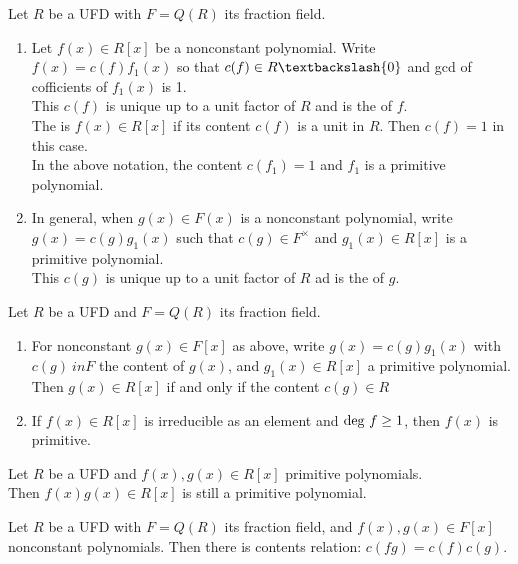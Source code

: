 \begin{definition}
Let $R$ be a UFD with $F=Q(R)$ its fraction field.
\begin{enumerate}[label=(\roman*)]
\item Let $f(x) \in R[x]$ be a nonconstant polynomial. Write $f(x) = c(f)f_1 (x)$ so that $c(f) \in R \textbackslash \{0\}$ and gcd of cofficients of $f_1(x)$ is 1.\\
This $c(f)$ is unique up to a unit factor of $R$ and is the  of $f$.\\
The  is $f(x) \in R[x]$ if its content $c(f)$ is a unit in $R$. Then $c(f)=1$ in this case.\\
In the above notation, the content $c(f_1) = 1$ and $f_1$ is a primitive polynomial.
\item In general, when $g(x) \in F(x)$ is a nonconstant polynomial, write $g(x)=c(g)g_1(x)$ such that $c(g) \in F^{\times}$ and $g_1(x) \in R[x]$ is a primitive polynomial.\\
This $c(g)$ is unique up to a unit factor of $R$ ad is the  of $g$.
\end{enumerate}
\end{definition}

\begin{remark}
Let $R$ be a UFD and $F=Q(R)$ its fraction field.
\begin{enumerate}[label=(\roman*)]
\item For nonconstant $g(x) \in F[x]$ as above, write $g(x)=c(g)g_1(x)$ with $c(g)\ in F$ the content of $g(x)$, and $g_1(x) \in R[x]$ a primitive polynomial.\\
Then $g(x) \in R[x]$ if and only if the content $c(g) \in R$
\item If $f(x) \in R[x]$ is irreducible as an element and $\textnormal{deg}\ f \geq 1$, then $f(x)$ is primitive.
\end{enumerate}
\end{remark}

\begin{proposition}
 Let $R$ be a UFD and $f(x), g(x) \in R[x]$ primitive polynomials.\\
Then $f(x)g(x) \in R[x]$ is still a primitive polynomial.
\end{proposition}

\begin{corollary}
 Let $R$ be a UFD with $F=Q(R)$ its fraction field, and $f(x), g(x) \in F[x]$ nonconstant polynomials. Then there is contents relation: $c(fg) = c(f)c(g)$.
\end{corollary}


